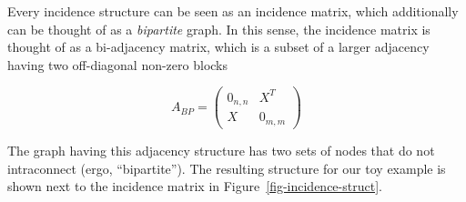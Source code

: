 \documentclass[%
	12pt,
		oneside,
		letterpaper
]{book}
\begin{document}
Every incidence structure can be seen as an incidence matrix, which
additionally can be thought of as a \emph{bipartite} graph. In this
sense, the incidence matrix is thought of as a bi-adjacency matrix,
which is a subset of a larger adjacency having two off-diagonal non-zero
blocks

\[
A_{BP} = 
\begin{pmatrix}
0_{n,n} & X^T \\
X & 0_{m,m}
\end{pmatrix}
\]

The graph having this adjacency structure has two sets of nodes that do
not intraconnect (ergo, ``bipartite''). The resulting structure for our
toy example is shown next to the incidence matrix in
Figure~\ref{fig-incidence-struct}.

\begin{figure}

\begin{minipage}{0.50\linewidth}

\centering{

\[
\small
X^{m\times n}=
\begin{array}{c c}
& \begin{array}{cccccccccc} a & b & c & d & e & f & g & h & i & j\\ \end{array} \\
\begin{array}{c c } x_1\\x_2\\x_3\\x_4\\ \vdots \\ x_m\end{array} &
\left[
\begin{array}{c c c c c c c c c c}
  .  & .   &  1  & .   &  1  & .   &  1  &  1  & .   & .  \\
  1  & .   & .   & .   &  1  &  1  & .   & .   & .   & .  \\
  .  &  1  & .   & .   & .   &  1  & .   & .   &  1  &  1 \\
  .  & .   & .   &  1  &  1  & .   & .   &  1  & .   & .  \\
  &&&& \vdots &&&&&
  \\
  &&&& \vdots &&&&&
\end{array}
\right]
\end{array}
\]

}


\end{minipage}
\end{figure}
\end{document}
